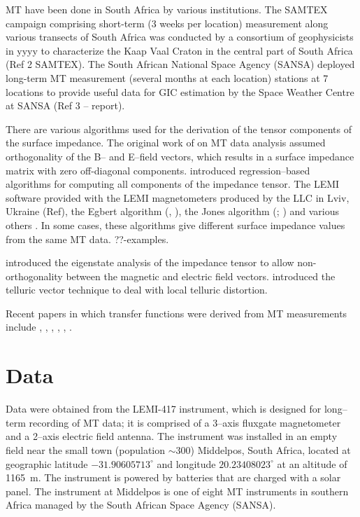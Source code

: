 \documentclass[draft,linenumbers]{agujournal2018}
\begin{document}
MT have been done in South Africa by various institutions. The SAMTEX campaign comprising short-term (3 weeks per location) measurement along various transects of South Africa was conducted by a consortium of geophysicists in yyyy to characterize the Kaap Vaal Craton in the central part of South Africa (Ref 2 SAMTEX). The South African National Space Agency (SANSA) deployed long-term MT measurement (several months at each location) stations at 7 locations to provide useful data for GIC estimation by the Space Weather Centre at SANSA  (Ref 3 – report).

There are various algorithms used for the derivation of the tensor components of the surface impedance. The original work of \cite{Cagniard1953} on MT data analysis assumed orthogonality of the B-- and E--field vectors, which results in a surface impedance matrix with zero off-diagonal components. \cite{Sims1971} introduced regression--based algorithms for computing all components of the impedance tensor. The LEMI software provided with the LEMI magnetometers produced by the LLC in Lviv, Ukraine (Ref), the Egbert algorithm (\cite{Egbert1997}, \cite{Egbert2011}), the Jones algorithm (\cite{Jones1989}; \cite{Chave2012}) and various others \cite{Larsen1996}. In some cases, these algorithms give different surface impedance values from the same MT data. ??-examples. 

\cite{Eggers1982} introduced the eigenstate analysis of
the impedance tensor to allow non-orthogonality between the magnetic and electric field vectors. \cite{Bahr1988} introduced the telluric vector technique to deal with local telluric distortion.

Recent papers in which transfer functions were derived from MT measurements include \cite{Fujii2015}, \cite{Jones1989}, \cite{Heyns2020}, \cite{Weigel2019}, \cite{Chen2021}, 
\cite{Moorkamp2007}.

\section{Data}
\label{section:Data}

Data were obtained from the LEMI-417 instrument, which is designed for long--term recording of MT data; it is comprised of a 3--axis fluxgate magnetometer and a 2--axis electric field antenna. The instrument was installed in an empty field near the small town (population $\sim$300) Middelpos, South Africa, located at geographic latitude $-31.90605713^\circ$ and longitude $20.23408023^\circ$ at an altitude of 1165~m. The instrument is powered by batteries that are charged with a solar panel. The instrument at Middelpos is one of eight MT instruments in southern Africa managed by the South African Space Agency (SANSA).
\end{document}
